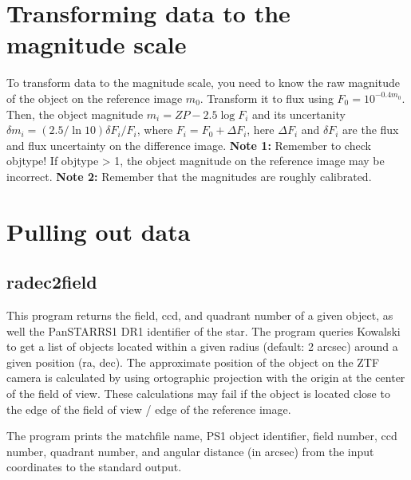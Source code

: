\documentclass[11pt]{article}
\begin{document}
\section{Transforming data to the magnitude scale}
\label{sec:cals}

To transform data to the magnitude scale, you need to know the raw magnitude of the object on the reference image $m_0$. Transform it to flux using $F_0 = 10^{-0.4 m_0}$. Then, the object magnitude $m_i = ZP - 2.5\log F_i$ and its uncertanity $\delta m_i = (2.5/\ln 10)\delta F_i/F_i$, where $F_i = F_0 + \Delta F_i$, here $\Delta F_i$ and $\delta F_i$ are the flux and flux uncertainty on the difference image. \textbf{Note 1:} Remember to check objtype! If objtype > 1, the object magnitude on the reference image may be incorrect. \textbf{Note 2:} Remember that the magnitudes are roughly calibrated.

\section{Pulling out data}

\subsection{radec2field}

This program returns the field, ccd, and quadrant number of a given object, as well the PanSTARRS1 DR1 identifier of the star. The program queries Kowalski to get a list of objects located within a given radius (default: 2 arcsec) around a given position (ra, dec). The approximate position of the object on the ZTF camera is calculated by using ortographic projection with the origin at the center of the field of view. These calculations may fail if the object is located close to the edge of the field of view / edge of the reference image.

\vspace{0.2cm}
The program prints the matchfile name, PS1 object identifier, field number, ccd number, quadrant number, and angular distance (in arcsec) from the input coordinates to the standard output.

\vspace{0.2cm}
\noindent{}
\end{document}

